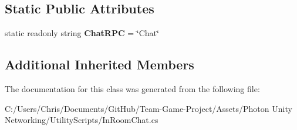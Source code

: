 \subsection*{Static Public Attributes}
\begin{DoxyCompactItemize}
\item 
static readonly string {\bfseries Chat\+R\+PC} = \char`\"{}Chat\char`\"{}\hypertarget{class_in_room_chat_aa0b4576ed000e07dc1dc587afcf0f21c}{}\label{class_in_room_chat_aa0b4576ed000e07dc1dc587afcf0f21c}

\end{DoxyCompactItemize}
\subsection*{Additional Inherited Members}


The documentation for this class was generated from the following file\+:\begin{DoxyCompactItemize}
\item 
C\+:/\+Users/\+Chris/\+Documents/\+Git\+Hub/\+Team-\/\+Game-\/\+Project/\+Assets/\+Photon Unity Networking/\+Utility\+Scripts/In\+Room\+Chat.\+cs\end{DoxyCompactItemize}

